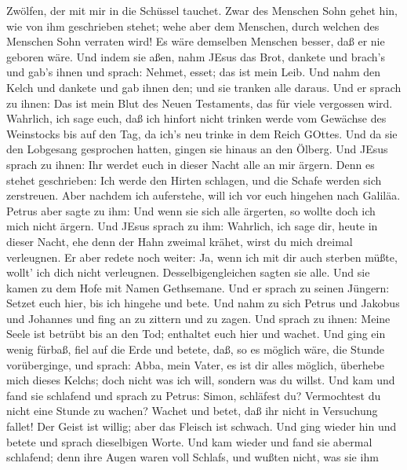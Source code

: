 Zwölfen, der mit mir in die Schüssel tauchet.  Zwar des
Menschen Sohn gehet hin, wie von ihm geschrieben stehet; wehe aber dem
Menschen, durch welchen des Menschen Sohn verraten wird! Es wäre
demselben Menschen besser, daß er nie geboren wäre.  Und
indem sie aßen, nahm JEsus das Brot, dankete und brach's und gab's ihnen
und sprach: Nehmet, esset; das ist mein Leib.  Und nahm den
Kelch und dankete und gab ihnen den; und sie tranken alle daraus.
 Und er sprach zu ihnen: Das ist mein Blut des Neuen
Testaments, das für viele vergossen wird.  Wahrlich, ich
sage euch, daß ich hinfort nicht trinken werde vom Gewächse des
Weinstocks bis auf den Tag, da ich's neu trinke in dem Reich GOttes.
 Und da sie den Lobgesang gesprochen hatten, gingen sie
hinaus an den Ölberg.  Und JEsus sprach zu ihnen: Ihr
werdet euch in dieser Nacht alle an mir ärgern. Denn es stehet
geschrieben: Ich werde den Hirten schlagen, und die Schafe werden sich
zerstreuen.  Aber nachdem ich auferstehe, will ich vor euch
hingehen nach Galiläa.  Petrus aber sagte zu ihm: Und wenn
sie sich alle ärgerten, so wollte doch ich mich nicht ärgern.
 Und JEsus sprach zu ihm: Wahrlich, ich sage dir, heute in
dieser Nacht, ehe denn der Hahn zweimal krähet, wirst du mich dreimal
verleugnen.  Er aber redete noch weiter: Ja, wenn ich mit
dir auch sterben müßte, wollt' ich dich nicht verleugnen.
Desselbigengleichen sagten sie alle.  Und sie kamen zu dem
Hofe mit Namen Gethsemane. Und er sprach zu seinen Jüngern: Setzet euch
hier, bis ich hingehe und bete.  Und nahm zu sich Petrus
und Jakobus und Johannes und fing an zu zittern und zu zagen.
 Und sprach zu ihnen: Meine Seele ist betrübt bis an den
Tod; enthaltet euch hier und wachet.  Und ging ein wenig
fürbaß, fiel auf die Erde und betete, daß, so es möglich wäre, die
Stunde vorüberginge,  und sprach: Abba, mein Vater, es ist
dir alles möglich, überhebe mich dieses Kelchs; doch nicht was ich will,
sondern was du willst.  Und kam und fand sie schlafend und
sprach zu Petrus: Simon, schläfest du? Vermochtest du nicht eine Stunde
zu wachen?  Wachet und betet, daß ihr nicht in Versuchung
fallet! Der Geist ist willig; aber das Fleisch ist schwach.
 Und ging wieder hin und betete und sprach dieselbigen
Worte.  Und kam wieder und fand sie abermal schlafend; denn
ihre Augen waren voll Schlafs, und wußten nicht, was sie ihm
